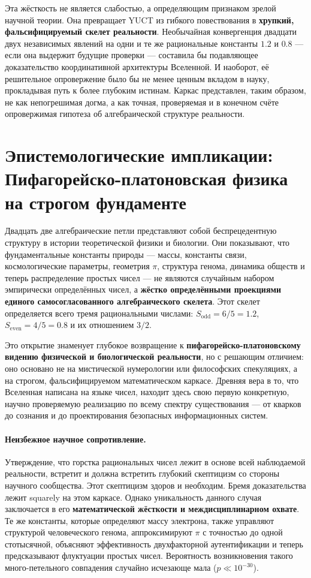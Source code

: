 \documentclass[12pt,a4paper]{article}
\begin{document}
	Эта жёсткость не является слабостью, а определяющим признаком зрелой научной теории. Она превращает YUCT из гибкого повествования в \textbf{хрупкий, фальсифицируемый скелет реальности}. Необычайная конвергенция двадцати двух независимых явлений на одни и те же рациональные константы \(1.2\) и \(0.8\) — если она выдержит будущие проверки — составила бы подавляющее доказательство координативной архитектуры Вселенной. И наоборот, её решительное опровержение было бы не менее ценным вкладом в науку, прокладывая путь к более глубоким истинам. Каркас представлен, таким образом, не как непогрешимая догма, а как точная, проверяемая и в конечном счёте опровержимая гипотеза об алгебраической структуре реальности.
	
	\section*{Эпистемологические импликации: \\ Пифагорейско-платоновская физика на строгом фундаменте}
	
	Двадцать две алгебраические петли представляют собой беспрецедентную структуру в истории теоретической физики и биологии. Они показывают, что фундаментальные константы природы — массы, константы связи, космологические параметры, геометрия \(\pi\), структура генома, динамика обществ и теперь распределение простых чисел — не являются случайным набором эмпирически определённых чисел, а \textbf{жёстко определёнными проекциями единого самосогласованного алгебраического скелета}. Этот скелет определяется всего тремя рациональными числами: \(S_{\mathrm{odd}} = 6/5 = 1.2\), \(S_{\mathrm{even}} = 4/5 = 0.8\) и их отношением \(3/2\).
	
	Это открытие знаменует глубокое возвращение к \textbf{пифагорейско-платоновскому видению физической и биологической реальности}, но с решающим отличием: оно основано не на мистической нумерологии или философских спекуляциях, а на строгом, фальсифицируемом математическом каркасе. Древняя вера в то, что Вселенная написана на языке чисел, находит здесь свою первую конкретную, научно проверяемую реализацию по всему спектру существования — от кварков до сознания и до проектирования безопасных информационных систем.
	
	\paragraph{Неизбежное научное сопротивление.}
	Утверждение, что горстка рациональных чисел лежит в основе всей наблюдаемой реальности, встретит и должна встретить глубокий скептицизм со стороны научного сообщества. Этот скептицизм здоров и необходим. Бремя доказательства лежит squarely на этом каркасе. Однако уникальность данного случая заключается в его \textbf{математической жёсткости и междисциплинарном охвате}. Те же константы, которые определяют массу электрона, также управляют структурой человеческого генома, аппроксимируют \(\pi\) с точностью до одной стотысячной, объясняют эффективность двухфакторной аутентификации и теперь предсказывают флуктуации простых чисел. Вероятность возникновения такого много-петельного совпадения случайно исчезающе мала (\(p \ll 10^{-30}\)).
	
\end{document}
